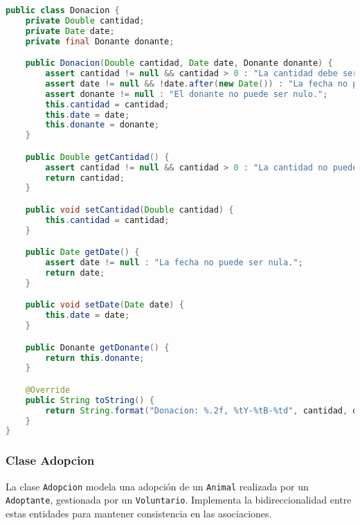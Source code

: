\begin{lstlisting}[language=Java]
public class Donacion {
    private Double cantidad;
    private Date date;
    private final Donante donante;

    public Donacion(Double cantidad, Date date, Donante donante) {
        assert cantidad != null && cantidad > 0 : "La cantidad debe ser positiva.";
        assert date != null && !date.after(new Date()) : "La fecha no puede ser nula ni estar en el futuro.";
        assert donante != null : "El donante no puede ser nulo.";
        this.cantidad = cantidad;
        this.date = date;
        this.donante = donante;
    }

    public Double getCantidad() {
        assert cantidad != null && cantidad > 0 : "La cantidad no puede ser nula.";
        return cantidad;
    }

    public void setCantidad(Double cantidad) {
        this.cantidad = cantidad;
    }

    public Date getDate() {
        assert date != null : "La fecha no puede ser nula.";
        return date;
    }

    public void setDate(Date date) {
        this.date = date;
    }

    public Donante getDonante() {
        return this.donante;
    }

    @Override
    public String toString() {
        return String.format("Donacion: %.2f, %tY-%tB-%td", cantidad, date, date, date);
    }
}
\end{lstlisting}

\subsubsection{Clase Adopcion}
La clase \texttt{Adopcion} modela una adopción de un \texttt{Animal} realizada por un \texttt{Adoptante}, gestionada por un \texttt{Voluntario}. Implementa la bidireccionalidad entre estas entidades para mantener consistencia en las asociaciones.

